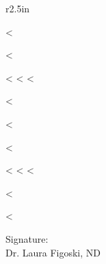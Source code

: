 \documentclass{NDChart}
\begin{document}
\begin{wrapfigure}{r}{2.5in}

  \begin{sidebox}[frametitle={Problem List}]
    <%
    \begin{boxitemize}
      \raggedright
      <%
        \item <%
              <%
      <%
    \end{boxitemize}
    <%
  \end{sidebox}

  \vspace*{11pt}

  \begin{sidebox}[frametitle={Currently Taking}]
    <%
    \begin{boxitemize}
      \raggedright
      <%
        \item <%
              <%
      <%
    \end{boxitemize}
    <%
  \end{sidebox}

  \vspace{-22pt}

\end{wrapfigure}

<%

\vfill
\begin{flushright}
Signature: \underline{\hspace{2.5in}}\\
Dr. Laura Figoski, ND
\end{flushright}
\end{document}
